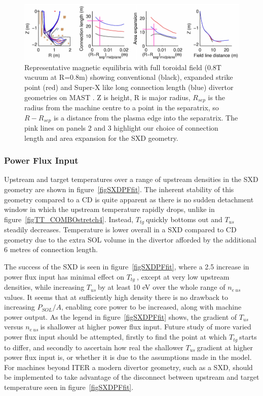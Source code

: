\documentclass[12pt]{article}  %
\providecommand{\neus}{$n_{e~us}~$} %
\providecommand{\Tus}{$T_{us}~$} %
\providecommand{\Ttg}{$T_{tg}~$} %
\begin{document}
\begin{figure}[h]
\includegraphics[scale=0.75]{Figures/MASTUdesignpapersFig2_2.png}
\centering
\caption{Representative magnetic equilibria with full toroidal field (0.8T vacuum at R=0.8m) showing conventional (black), expanded strike point (red) and Super-X like long connection length (blue) divertor geometries on MAST \cite{Fishpool2013}. Z is height, R is major radius, $ R_{sep} $ is the radius from the machine centre to a point in the separatrix, so $ R - R_{sep} $ is a distance from the plasma edge into the separatrix. The pink lines on panels 2 and 3 highlight our choice of connection length and area expansion for the SXD geometry.}\label{figMASTUdesignpapersFig2}
\end{figure}


\subsubsection{Power Flux Input}\label{sssecPF}
Upstream and target temperatures over a range of upstream densities in the SXD geometry are shown in figure~\ref{figSXDPFfit}. The inherent stability of this geometry compared to a CD is quite apparent as there is no sudden detachment window in which the upstream temperature rapidly drops, unlike in figure~\ref{figTT_COMBOstretch4}. Instead, \Ttg quickly bottoms out and \Tus steadily decreases. Temperature is lower overall in a SXD compared to CD geometry due to the extra SOL volume in the divertor afforded by the additional 6 metres of connection length. 

The success of the SXD is seen in figure~\ref{figSXDPFfit}, where a 2.5 increase in power flux input has minimal effect on \Ttg, except at very low upstream densities, while increasing \Tus by at least 10 eV over the whole range of \neus values. It seems that at sufficiently high density there is no drawback to increasing $P_{SOL}/A$, enabling core power to be increased, along with machine power output. As the legend in figure~\ref{figSXDPFfit} shows, the gradient of \Tus versus \neus is shallower at higher power flux input. Future study of more varied power flux input should be attempted, firstly to find the point at which \Ttg starts to differ, and secondly to ascertain how real the shallower \Tus gradient at higher power flux input is, or whether it is due to the assumptions made in the model. For machines beyond ITER a modern divertor geometry, such as a SXD, should be implemented to take advantage of the disconnect between upstream and target temperature seen in figure~\ref{figSXDPFfit}.
\end{document}
